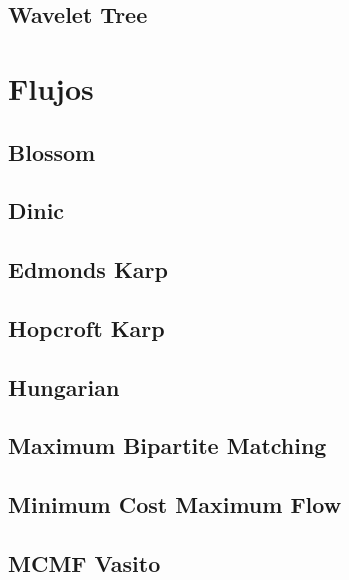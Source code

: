 \subsection{Wavelet Tree}
\raggedbottom
\hrulefill

\section{Flujos}
\subsection{Blossom}
\raggedbottom
\hrulefill
\subsection{Dinic}
\raggedbottom
\hrulefill
\subsection{Edmonds Karp}
\raggedbottom
\hrulefill
\subsection{Hopcroft Karp}
\raggedbottom
\hrulefill
\subsection{Hungarian}
\raggedbottom
\hrulefill
\subsection{Maximum Bipartite Matching}
\raggedbottom
\hrulefill
\subsection{Minimum Cost Maximum Flow}
\raggedbottom
\hrulefill
\subsection{MCMF Vasito}
\raggedbottom
\hrulefill
